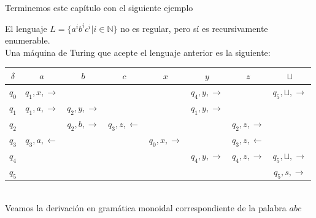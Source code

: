 \documentclass[../main.tex]{subfiles}
\begin{document}
Terminemos este capítulo con el siguiente ejemplo

\begin{ej}
	El lenguaje $L=\{ a^i b^i c^i | i \in \mathbb{N}\}$ no es regular, pero sí es recursivamente enumerable. \\
	Una máquina de Turing que acepte el lenguaje anterior es la siguiente: 
	
	\begin{tabular}{|c|c|c|c|c|c|c|c|}
		\hline
		$\delta$ & $a$ & $b$ & $c$ & $x$ & $y$ & $z$ & $\sqcup$  \\
		\hline
		$q_0$ & $q_1,x,\to$ &  &  &  & $q_4,y,\to$ &  & $q_5,\sqcup,\to$  \\
		\hline
		$q_1$ & $q_1,a,\to$ & $q_2,y,\to$ &  &  & $q_1,y,\to$ &  &    \\
		\hline
		$q_2$ &  & $q_2,b,\to$ & $q_3,z,\leftarrow$ &  &  & $q_2,z,\to$ &  \\
		\hline
		$q_3$ & $q_3,a,\leftarrow $ &  &  & $q_0,x,\to$ &  & $q_3,z,\leftarrow$ &    \\
		\hline
		$q_4$ &  &  &  &  & $q_4,y,\to$ & $q_4,z,\to$ & $q_5, \sqcup, \to$   \\
		\hline
		$q_5$ &  &  &  &  &  &  & $q_5,s,\to$ \\
		\hline
	\end{tabular}
	\\
	Veamos la derivación en gramática monoidal correspondiente de la palabra $abc$
\end{ej}
\end{document}
